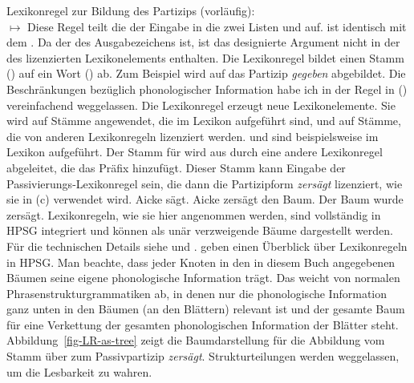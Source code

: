 \ea
\label{lr-passive-prelim}
Lexikonregel zur Bildung des Partizips (vorläufig):\\
 $\mapsto$
\z
Diese Regel teilt die \argstl der Eingabe in die zwei Listen  und  auf.  ist
identisch mit dem \daw. Da der \argstw des Ausgabezeichens  ist, ist das designierte
Argument nicht in der \argstl des lizenzierten Lexikonelements enthalten. Die Lexikonregel bildet
einen Stamm () auf ein Wort () ab. Zum Beispiel wird  auf das
Partizip \emph{gegeben} abgebildet. Die Beschränkungen bezüglich phonologischer Information habe ich in der Regel in
() vereinfachend weggelassen. %
\label{page-lexical-rule-explanation-start}%
Die Lexikonregel erzeugt neue Lexikonelemente. Sie wird auf Stämme angewendet, die im Lexikon aufgeführt sind, und auf
Stämme, die von anderen Lexikonregeln lizenziert werden.  und  sind beispielsweise im Lexikon aufgeführt. Der Stamm für  wird aus  durch eine andere
Lexikonregel abgeleitet, die das Präfix  hinzufügt. Dieser Stamm kann Eingabe der Passivierungs-Lexikonregel sein,
die dann die Partizipform \emph{zersägt} lizenziert, wie sie in (c) verwendet wird.
\eal
\ex 
Aicke sägt.
\ex
Aicke zersägt den Baum.
\ex
Der Baum wurde zersägt.
\zl
Lexikonregeln, wie sie hier angenommen werden, sind vollständig in HPSG integriert und können als unär
verzweigende Bäume dargestellt werden. Für die technischen Details siehe \citet{Meurers2000b} und
\citet{BC99a}. \citet{DavisKoenigLexicon} geben einen Überblick über Lexikonregeln in HPSG. Man beachte, dass jeder Knoten in den in diesem Buch angegebenen Bäumen seine eigene
phonologische Information trägt. Das weicht von normalen Phrasenstrukturgrammatiken ab, in denen nur die
phonologische Information ganz unten in den Bäumen (an den Blättern) relevant ist und der gesamte Baum
für eine Verkettung der gesamten phonologischen Information der Blätter steht. Abbildung~\ref{fig-LR-as-tree}
zeigt die Baumdarstellung für die Abbildung vom Stamm  über  zum
Passivpartizip \emph{zersägt}. Strukturteilungen werden weggelassen, um die Lesbarkeit zu wahren.

